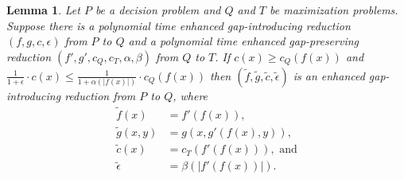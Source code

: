 \documentclass[]{article}
\theoremstyle{plain}
\newtheorem{lemma}{Lemma}
\theoremstyle{definition}
\begin{document}
\begin{lemma}\label{lem:compose}
  Let $P$ be a decision problem and $Q$ and $T$ be maximization problems.
  Suppose there is a polynomial time enhanced gap-introducing reduction $(f, g, c, \epsilon)$ from $P$ to $Q$ and a polynomial time enhanced gap-preserving reduction $(f', g', c_Q, c_T, \alpha, \beta)$ from $Q$ to $T$.
  If $c(x) \geq c_Q(f(x))$ and $\frac{1}{1 + \epsilon} \cdot c(x) \leq \frac{1}{1 + \alpha(|f(x)|)} \cdot c_Q(f(x))$ then $(\tilde{f}, \tilde{g}, \tilde{c}, \tilde{\epsilon})$ is an enhanced gap-introducing reduction from $P$ to $Q$, where
  \begin{align*}
    \tilde{f}(x) & = f'(f(x)), \\
    \tilde{g}(x, y) & = g(x, g'(f(x), y)), \\
    \tilde{c}(x) & = c_T(f'(f(x))), \text{ and} \\
    \tilde{\epsilon} & = \beta(|f'(f(x))|).
  \end{align*}
\end{lemma}
\end{document}

